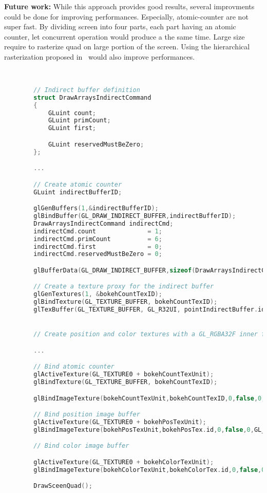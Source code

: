\textbf{Future work:} While this approach provides good results, several improvments could be done for improving performances. Especially, atomic-counter are not super fast. By dividing screen into four parts, each part having an atomic counter, let concurrent operation would produce a the same time. Large \coc size require to rasterize quad on large portion of the screen. Using the hierarchical rasterization proposed in~\cite{Futurmark11} would also improve performances.



\begin{lstlisting}[language=C++,float={htb},caption={Initialization and drawing for extracting bokehs.},label={YourName:bokehextraction}]


		// Indirect buffer definition
		struct DrawArraysIndirectCommand
		{
			GLuint count;
			GLuint primCount;
			GLuint first;

			GLuint reservedMustBeZero;
		};

		...

		// Create atomic counter
		GLuint indirectBufferID;

		glGenBuffers(1,&indirectBufferID);
		glBindBuffer(GL_DRAW_INDIRECT_BUFFER,indirectBufferID);
		DrawArraysIndirectCommand indirectCmd;
		indirectCmd.count              = 1;
		indirectCmd.primCount          = 6;
		indirectCmd.first              = 0;
		indirectCmd.reservedMustBeZero = 0;

		glBufferData(GL_DRAW_INDIRECT_BUFFER,sizeof(DrawArraysIndirectCommand),&indirecCmd,GL_DYNAMIC_DRAW);

		// Create a texture proxy for the indirect buffer
		glGenTextures(1, &bokehCountTexID);
		glBindTexture(GL_TEXTURE_BUFFER, bokehCountTexID);
		glTexBuffer(GL_TEXTURE_BUFFER, GL_R32UI, pointIndirectBuffer.id);


		// Create position and color textures with a GL_RGBA32F inner format

		...

		// Bind atomic counter
		glActiveTexture(GL_TEXTURE0 + bokehCountTexUnit);
		glBindTexture(GL_TEXTURE_BUFFER, bokehCountTexID);

		glBindImageTexture(bokehCountTexUnit,bokehCountTexID,0,false,0,GL_READ_WRITE,GL_R32UI);

		// Bind position image buffer
		glActiveTexture(GL_TEXTURE0 + bokehPosTexUnit);
		glBindImageTexture(bokehPosTexUnit,bokehPosTex.id,0,false,0,GL_READ_WRITE,GL_RGBA32F);

		// Bind color image buffer

		glActiveTexture(GL_TEXTURE0 + bokehColorTexUnit);
		glBindImageTexture(bokehColorTexUnit,bokehColorTex.id,0,false,0,GL_READ_WRITE,GL_RGBA32F);

		DrawSceenQuad();
\end{lstlisting}


